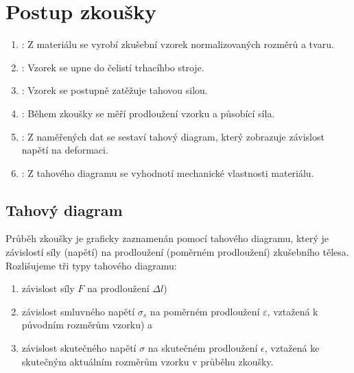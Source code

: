 \documentclass[letterpaper,10pt,english]{jupyterBook}
\begin{document}
\section{Postup zkoušky}
\label{\detokenize{Prednasky/2_3_Tahov_xe1_zkou_u0161ka:postup-zkousky}}\begin{enumerate}
%
\item {} 
\sphinxAtStartPar
{}: Z materiálu se vyrobí zkušební vzorek normalizovaných rozměrů a tvaru.

\item {} 
\sphinxAtStartPar
{}: Vzorek se upne do čelistí trhacíhbo stroje.

\item {} 
\sphinxAtStartPar
{}: Vzorek se postupně zatěžuje tahovou silou.

\item {} 
\sphinxAtStartPar
{}: Během zkoušky se měří prodloužení vzorku a působící síla.

\item {} 
\sphinxAtStartPar
{}: Z naměřených dat se sestaví tahový diagram, který zobrazuje závislost napětí na deformaci.

\item {} 
\sphinxAtStartPar
{}: Z tahového diagramu se vyhodnotí mechanické vlastnosti materiálu.

\end{enumerate}


\subsection{Tahový diagram}
\label{\detokenize{Prednasky/2_3_Tahov_xe1_zkou_u0161ka:tahovy-diagram}}
\sphinxAtStartPar
Průběh zkoušky je graficky zaznamenán pomocí tahového diagramu, který je závislostí síly (napětí) na prodloužení (poměrném prodloužení) zkušebního tělesa. Rozlišujeme tři typy tahového diagramu:
\begin{enumerate}
%
\item {} 
\sphinxAtStartPar
{} \sphinxhyphen{} závislost síly \(F\) na prodloužení \(\Delta l\))

\item {} 
\sphinxAtStartPar
{} \sphinxhyphen{} závislost smluvného napětí \(\sigma_s\) na poměrném prodloužení \(\varepsilon\), vztažená k původním rozměrům vzorku) a

\item {} 
\sphinxAtStartPar
{} \sphinxhyphen{} závislost skutečného napětí \(\sigma\) na skutečném prodloužení \(\epsilon\), vztažená ke skutečným aktuálním rozměrům vzorku v průběhu zkoušky.

\end{enumerate}
\end{document}
